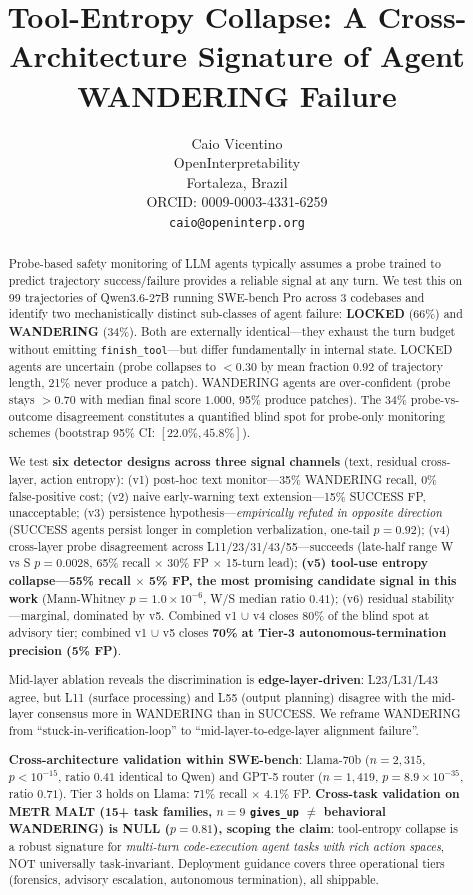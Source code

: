 \documentclass[11pt]{article}
\title{Tool-Entropy Collapse: A Cross-Architecture Signature of Agent WANDERING Failure}
\author{%
  Caio Vicentino \\
  OpenInterpretability \\
  Fortaleza, Brazil \\
  ORCID: 0009-0003-4331-6259 \\
  \texttt{caio@openinterp.org}%
}
\begin{document}
\maketitle

\begin{abstract}
Probe-based safety monitoring of LLM agents typically assumes a probe trained to predict trajectory success/failure provides a reliable signal at any turn. We test this on 99 trajectories of Qwen3.6-27B running SWE-bench Pro across 3 codebases and identify two mechanistically distinct sub-classes of agent failure: \textbf{LOCKED} (66\%) and \textbf{WANDERING} (34\%). Both are externally identical---they exhaust the turn budget without emitting \texttt{finish\_tool}---but differ fundamentally in internal state. LOCKED agents are uncertain (probe collapses to $<0.30$ by mean fraction $0.92$ of trajectory length, 21\% never produce a patch). WANDERING agents are over-confident (probe stays $>0.70$ with median final score $1.000$, 95\% produce patches). The 34\% probe-vs-outcome disagreement constitutes a quantified blind spot for probe-only monitoring schemes (bootstrap 95\% CI: $[22.0\%, 45.8\%]$).

We test \textbf{six detector designs across three signal channels} (text, residual cross-layer, action entropy): (v1) post-hoc text monitor---35\% WANDERING recall, 0\% false-positive cost; (v2) naive early-warning text extension---15\% SUCCESS FP, unacceptable; (v3) persistence hypothesis---\emph{empirically refuted in opposite direction} (SUCCESS agents persist longer in completion verbalization, one-tail $p = 0.92$); (v4) cross-layer probe disagreement across L11/23/31/43/55---succeeds (late-half range W vs S $p = 0.0028$, 65\% recall $\times$ 30\% FP $\times$ 15-turn lead); \textbf{(v5) tool-use entropy collapse---55\% recall $\times$ 5\% FP, the most promising candidate signal in this work} (Mann-Whitney $p = 1.0\times10^{-6}$, W/S median ratio $0.41$); (v6) residual stability---marginal, dominated by v5. Combined v1 $\cup$ v4 closes 80\% of the blind spot at advisory tier; combined v1 $\cup$ v5 closes \textbf{70\% at Tier-3 autonomous-termination precision (5\% FP)}.

Mid-layer ablation reveals the discrimination is \textbf{edge-layer-driven}: L23/L31/L43 agree, but L11 (surface processing) and L55 (output planning) disagree with the mid-layer consensus more in WANDERING than in SUCCESS. We reframe WANDERING from ``stuck-in-verification-loop'' to ``mid-layer-to-edge-layer alignment failure''.

\textbf{Cross-architecture validation within SWE-bench}: Llama-70b ($n=2{,}315$, $p<10^{-15}$, ratio $0.41$ identical to Qwen) and GPT-5 router ($n=1{,}419$, $p=8.9\times10^{-35}$, ratio $0.71$). Tier 3 holds on Llama: 71\% recall $\times$ 4.1\% FP. \textbf{Cross-task validation on METR MALT (15+ task families, $n=9$ \texttt{gives\_up} $\ne$ behavioral WANDERING) is NULL ($p=0.81$), scoping the claim}: tool-entropy collapse is a robust signature for \emph{multi-turn code-execution agent tasks with rich action spaces}, NOT universally task-invariant. Deployment guidance covers three operational tiers (forensics, advisory escalation, autonomous termination), all shippable.
\end{abstract}
\end{document}
